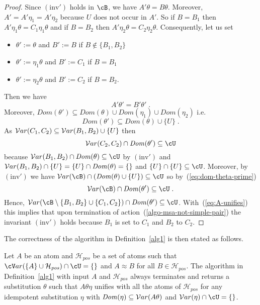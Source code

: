 \documentclass[fleqn]{tlp}
\newcommand{\var}{{\cV}ar}
\newcommand{\Dom}{\mathit{Dom}}
\newcommand{\Hpos}{\mathcal{H}_{\mathit{pos}}}
\begin{document}
\begin{appendix}
\begin{proof}
  Since $\mathrm{(inv')}$ holds in $\cB$, we have $A'\theta=B\theta$.
  Moreover, $A'=A'\eta_1=A'\eta_2$ because $U$ does not occur in $A'$.
  So if $B=B_1$ then $A'\eta_1\theta=C_1\eta_1\theta$ and
  if $B=B_2$ then $A'\eta_2\theta=C_2\eta_2\theta$.
  Consequently, let us set
  \begin{itemize}
  \item $\theta':=\theta$ and $B':=B$ if $B\not\in\{B_1,B_2\}$
  \item $\theta':=\eta_1\theta$ and $B':=C_1$ if $B=B_1$
  \item $\theta':=\eta_2\theta$ and $B':=C_2$ if $B=B_2$.
  \end{itemize}
  Then we have
  \begin{equation}\label{eq:A-unifies}
    A'\theta'=B'\theta'\;.
  \end{equation}
  Moreover,
  $\Dom(\theta')\subseteq
  \Dom(\theta)\cup\Dom(\eta_1)\cup\Dom(\eta_2)$
  i.e.
  \begin{equation}\label{eq:dom-theta-prime}
    \Dom(\theta')\subseteq
    \Dom(\theta)\cup\{U\}\;.
  \end{equation}
  As ${\cal V}ar(C_1,C_2)\subseteq{\cal V}ar(B_1,B_2)\cup\{U\}$ then
  \[\Var(C_2,C_2)\cap\Dom(\theta')
  \subseteq \cU\]
  because 
  $\Var(B_1,B_2)\cap\Dom(\theta)\subseteq \cU$
  by $\mathrm{(inv')}$ and 
  $\Var(B_1,B_2)\cap\{U\}=
  \{U\}\cap\Dom(\theta) = \emptyset$ and
  $\{U\}\cap\{U\}\subseteq \cU$.
  Moreover, by $\mathrm{(inv')}$ we have
  $\Var(\cB)\cap(\Dom(\theta)\cup\{U\})
  \subseteq \cU$ so by~(\ref{eq:dom-theta-prime})
  \[\Var(\cB)\cap\Dom(\theta')
  \subseteq \cU\;.\]
  Hence, $\Var(\cB\setminus\{B_1,B_2\}\cup\{C_1,C_2\})
  \cap\Dom(\theta')\subseteq \cU$.
With~(\ref{eq:A-unifies}) this implies that upon termination of
  action~(\ref{algo-msa-not-simple-pair}) the invariant
  $\mathrm{(inv')}$ holds
  because $B_1$ is set to $C_1$ and $B_2$ to $C_2$.
\end{proof}
The correctness of the algorithm in Definition~\ref{alg1} is then
stated as follows.

\begin{theorem}\label{theorem:correction-algo-pos}
  Let $A$ be an atom and $\Hpos$ be a set of atoms such that
  $\var(\{A\}\cup\Hpos)\cap\cU=\emptyset$ and $A\approx B$ for all
  $B\in\Hpos$. 
  The algorithm in Definition~\ref{alg1} with input $A$ and $\Hpos$
  always terminates and returns a substitution $\theta$ such that
  $A\theta\eta$ unifies with all the atoms of $\Hpos$ for any
  idempotent substitution $\eta$ with
  $\Dom(\eta)\subseteq\Var(A\theta)$ and
  $\Var(\eta)\cap\cU=\emptyset$.
\end{theorem}


\end{appendix}
\end{document}
